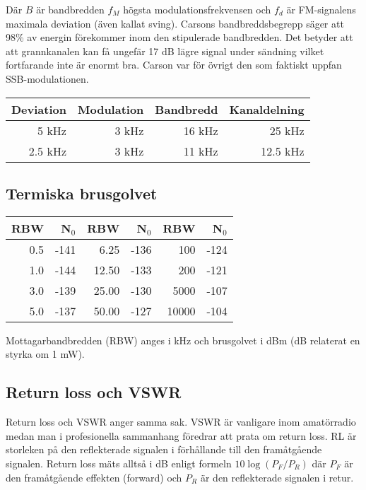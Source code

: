 Där $B$ är bandbredden $f_M$ högsta modulationsfrekvensen och $f_d$ är FM-signalens maximala deviation (även kallat sving). Carsons bandbreddsbegrepp säger att 98\% av energin förekommer inom den stipulerade bandbredden. Det betyder att att grannkanalen kan få ungefär 17 dB lägre signal under sändning vilket fortfarande inte är enormt bra. Carson var för övrigt den som faktiskt uppfan SSB-modulationen.

\begin{center}
\begin{tabular}{rrrr}
Deviation & Modulation & Bandbredd & Kanaldelning\\ \hline
5 kHz & 3 kHz & 16 kHz & 25 kHz\\
2.5 kHz & 3 kHz & 11 kHz & 12.5 kHz\\
\end{tabular}
\end{center}

\subsection{Termiska brusgolvet}

\begin{center}
\begin{tabular}{rr|rr|rr}
	\textbf{RBW} & \textbf{N$_0$} & \textbf{RBW} & \textbf{N$_0$} & \textbf{RBW} & \textbf{N$_0$} \\ \hline
	         0.5 &           -141 &         6.25 &           -136 &          100 &           -124 \\
	         1.0 &           -144 &        12.50 &           -133 &          200 &           -121 \\
	         3.0 &           -139 &        25.00 &           -130 &         5000 &           -107 \\
	         5.0 &           -137 &        50.00 &           -127 &        10000 &           -104
\end{tabular}
\end{center}

Mottagarbandbredden (RBW) anges i kHz och brusgolvet i dBm (dB relaterat en styrka om 1 mW).

\subsection{Return loss och VSWR}

Return loss och VSWR anger samma sak. VSWR är vanligare inom amatörradio medan man i profesionella sammanhang föredrar att prata om return loss. RL är storleken på den reflekterade signalen i förhållande till den framåtgående signalen. Return loss mäts alltså i dB enligt formeln $10\log(P_F/P_R)$ där $P_F$ är den framåtgående effekten (forward) och  $P_R$ är den reflekterade signalen i retur.

